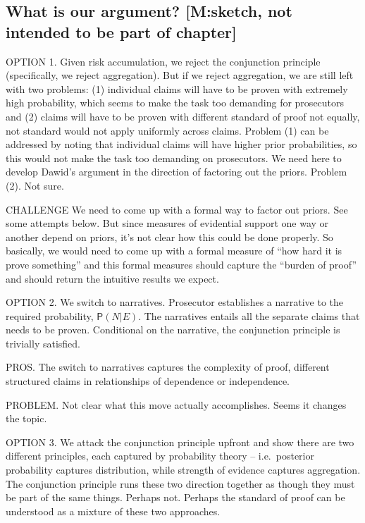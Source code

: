 \documentclass[
  10pt,
  dvipsnames,enabledeprecatedfontcommands]{scrartcl}
\newcommand{\pr}[1]{\mathsf{P}(#1)}
\begin{document}
\hypertarget{what-is-our-argument-msketch-not-intended-to-be-part-of-chapter}{%
\subsection{What is our argument? {[}M:sketch, not intended to be part
of
chapter{]}}\label{what-is-our-argument-msketch-not-intended-to-be-part-of-chapter}}

OPTION 1. Given risk accumulation, we reject the conjunction principle
(specifically, we reject aggregation). But if we reject aggregation, we
are still left with two problems: (1) individual claims will have to be
proven with extremely high probability, which seems to make the task too
demanding for prosecutors and (2) claims will have to be proven with
different standard of proof not equally, not standard would not apply
uniformly across claims. Problem (1) can be addressed by noting that
individual claims will have higher prior probabilities, so this would
not make the task too demanding on prosecutors. We need here to develop
Dawid's argument in the direction of factoring out the priors. Problem
(2). Not sure.

CHALLENGE We need to come up with a formal way to factor out priors. See
some attempts below. But since measures of evidential support one way or
another depend on priors, it's not clear how this could be done
properly. So basically, we would need to come up with a formal measure
of ``how hard it is prove something'' and this formal measures should
capture the ``burden of proof'' and should return the intuitive results
we expect.

OPTION 2. We switch to narratives. Prosecutor establishes a narrative to
the required probability, \(\pr{N \vert E}\). The narratives entails all
the separate claims that needs to be proven. Conditional on the
narrative, the conjunction principle is trivially satisfied.

PROS. The switch to narratives captures the complexity of proof,
different structured claims in relationships of dependence or
independence.

PROBLEM. Not clear what this move actually accomplishes. Seems it
changes the topic.

OPTION 3. We attack the conjunction principle upfront and show there are
two different principles, each captured by probability theory --
i.e.~posterior probability captures distribution, while strength of
evidence captures aggregation. The conjunction principle runs these two
direction together as though they must be part of the same things.
Perhaps not. Perhaps the standard of proof can be understood as a
mixture of these two approaches.
\end{document}
